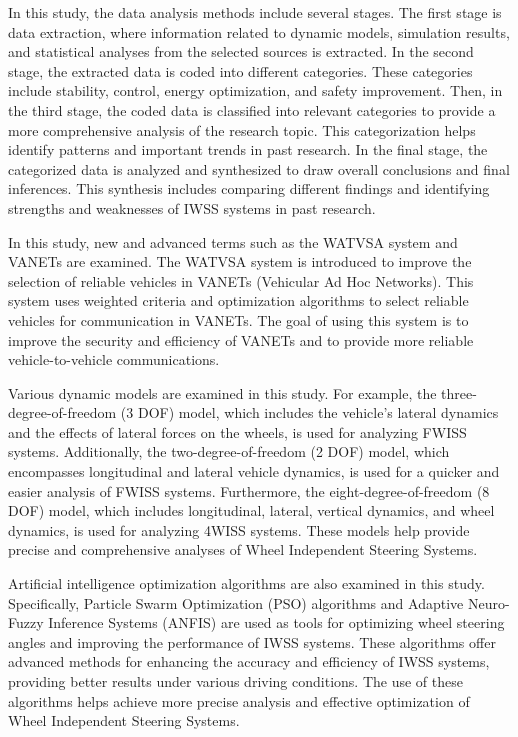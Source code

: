 \documentclass[a4paper,10pt]{article}
\begin{document}
        In this study, the data analysis methods include several stages. The first stage is data extraction, where information related to dynamic models, simulation results, and statistical analyses from the selected sources is extracted. In the second stage, the extracted data is coded into different categories. These categories include stability, control, energy optimization, and safety improvement. Then, in the third stage, the coded data is classified into relevant categories to provide a more comprehensive analysis of the research topic. This categorization helps identify patterns and important trends in past research. In the final stage, the categorized data is analyzed and synthesized to draw overall conclusions and final inferences. This synthesis includes comparing different findings and identifying strengths and weaknesses of IWSS systems in past research.

        In this study, new and advanced terms such as the WATVSA system and VANETs are examined. The WATVSA system is introduced to improve the selection of reliable vehicles in VANETs (Vehicular Ad Hoc Networks). This system uses weighted criteria and optimization algorithms to select reliable vehicles for communication in VANETs. The goal of using this system is to improve the security and efficiency of VANETs and to provide more reliable vehicle-to-vehicle communications.

        Various dynamic models are examined in this study. For example, the three-degree-of-freedom (3 DOF) model, which includes the vehicle's lateral dynamics and the effects of lateral forces on the wheels, is used for analyzing FWISS systems. Additionally, the two-degree-of-freedom (2 DOF) model, which encompasses longitudinal and lateral vehicle dynamics, is used for a quicker and easier analysis of FWISS systems. Furthermore, the eight-degree-of-freedom (8 DOF) model, which includes longitudinal, lateral, vertical dynamics, and wheel dynamics, is used for analyzing 4WISS systems. These models help provide precise and comprehensive analyses of Wheel Independent Steering Systems.

        Artificial intelligence optimization algorithms are also examined in this study. Specifically, Particle Swarm Optimization (PSO) algorithms and Adaptive Neuro-Fuzzy Inference Systems (ANFIS) are used as tools for optimizing wheel steering angles and improving the performance of IWSS systems. These algorithms offer advanced methods for enhancing the accuracy and efficiency of IWSS systems, providing better results under various driving conditions. The use of these algorithms helps achieve more precise analysis and effective optimization of Wheel Independent Steering Systems.
\end{document}

